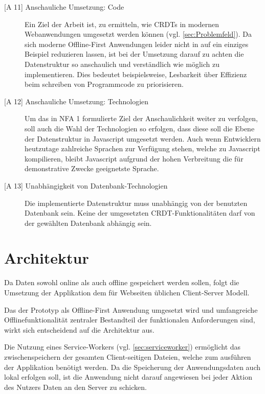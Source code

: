 \documentclass[a4paper, 12pt]{scrreprt}
\begin{document}
\begin{description}
	\item[{[A 11]} Anschauliche Umsetzung: Code]
	Ein Ziel der Arbeit ist, zu ermitteln, wie CRDTs in modernen Webanwendungen umgesetzt werden können (vgl. \ref{sec:Problemfeld}). Da sich moderne Offline-First Anwendungen leider nicht in auf ein einziges Beispiel reduzieren lassen, ist bei der Umsetzung darauf zu achten die Datenstruktur so anschaulich und verständlich wie möglich zu implementieren. Dies bedeutet beispielsweise, Lesbarkeit über Effizienz beim schreiben von Programmcode zu priorisieren.
	\item[{[A 12]} Anschauliche Umsetzung: Technologien]
	Um das in NFA 1 formulierte Ziel der Anschaulichkeit weiter zu verfolgen, soll auch die Wahl der Technologien so erfolgen, dass diese soll die Ebene der Datenstruktur in Javascript umgesetzt werden. Auch wenn Entwicklern heutzutage zahlreiche Sprachen zur Verfügung stehen, welche zu Javascript kompilieren, bleibt Javascript aufgrund der hohen Verbreitung die für demonstrative Zwecke geeignetste Sprache.
	\item[{[A 13]} Unabhängigkeit von Datenbank-Technologien]
	Die implementierte Datenstruktur muss unabhängig von der benutzten Datenbank sein. Keine der umgesetzten CRDT-Funktionalitäten darf von der gewählten Datenbank abhängig sein.
\end{description}

\section{Architektur}
\label{sec:Architektur}

Da Daten sowohl online als auch offline gespeichert werden sollen, folgt die Umsetzung der Applikation dem für Webseiten üblichen Client-Server Modell. 

Das der Prototyp als Offline-First Anwendung umgesetzt wird und umfangreiche Offlinefunktionalität zentraler Bestandteil der funktionalen Anforderungen sind, wirkt sich entscheidend auf die Architektur aus.

Die Nutzung eines Service-Workers (vgl. \ref{sec:serviceworker}) ermöglicht das zwischenspeichern der gesamten Client-seitigen Dateien, welche zum ausführen der Applikation benötigt werden. Da die Speicherung der Anwendungsdaten auch lokal erfolgen soll, ist die Anwendung nicht darauf angewiesen bei jeder Aktion des Nutzers Daten an den Server zu schicken.
\end{document}
